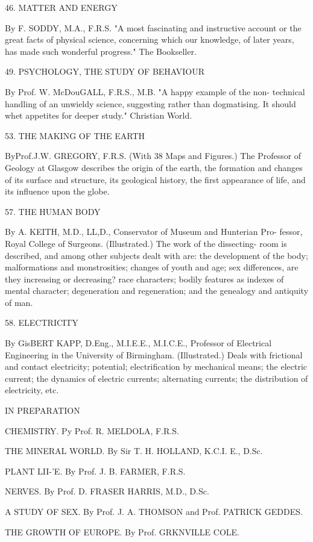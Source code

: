 \documentclass[12pt,leqno]{book}[2005/09/16]
\begin{document}
46. MATTER AND ENERGY

By F. SODDY, M.A., F.R.S. "A most fascinating and instructive account or
the great facts of physical science, concerning which our knowledge, of later
years, has made such wonderful progress." The Bookseller.

49. PSYCHOLOGY, THE STUDY OF BEHAVIOUR

By Prof. W. McDouGALL, F.R.S., M.B. "A happy example of the non-
technical handling of an unwieldy science, suggesting rather than dogmatising.
It should whet appetites for deeper study." Christian World.

53. THE MAKING OF THE EARTH

ByProf.J.W. GREGORY, F.R.S. (With 38 Maps and Figures.) The Professor
of Geology at Glasgow describes the origin of the earth, the formation and
changes of its surface and structure, its geological history, the first appearance
of life, and its influence upon the globe.

57. THE HUMAN BODY

By A. KEITH, M.D., LL,D., Conservator of Museum and Hunterian Pro-
fessor, Royal College of Surgeons. (Illustrated.) The work of the dissecting-
room is described, and among other subjects dealt with are: the development
of the body; malformations and monstrosities; changes of youth and age; sex
differences, are they increasing or decreasing? race characters; bodily features
as indexes of mental character; degeneration and regeneration; and the
genealogy and antiquity of man.

58. ELECTRICITY

By GisBERT KAPP, D.Eng., M.I.E.E., M.I.C.E., Professor of Electrical
Engineering in the University of Birmingham. (Illustrated.) Deals with
frictional and contact electricity; potential; electrification by mechanical
means; the electric current; the dynamics of electric currents; alternating
currents; the distribution of electricity, etc.

IN PREPARATION

CHEMISTRY. Py Prof. R. MELDOLA, F.R.S.

THE MINERAL WORLD. By Sir T. H. HOLLAND, K.C.I. E., D.Sc.

PLANT LII-'E. By Prof. J. B. FARMER, F.R.S.

NERVES. By Prof. D. FRASER HARRIS, M.D., D.Sc.

A STUDY OF SEX. By Prof. J. A. THOMSON and Prof. PATRICK GEDDES.

THE GROWTH OF EUROPE. By Prof. GRKNVILLE COLE.
\end{document}
